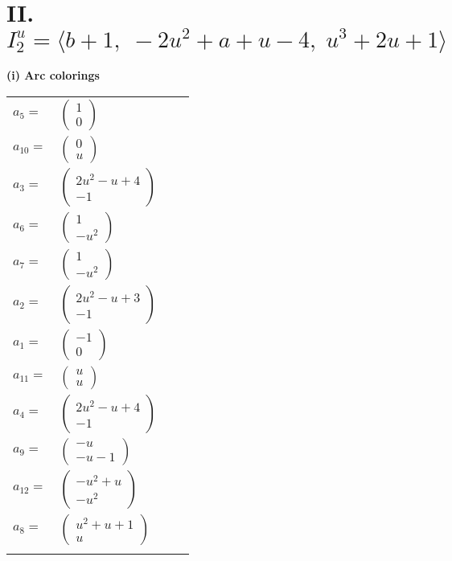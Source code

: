 \documentclass[1p]{elsarticle_modified}
\theoremstyle{definition}
\begin{document}
\centering \section*{II. $I^u_{2}= \langle b+1,\;-2 u^2+a+u-4,\;u^3+2 u+1 \rangle$}
\flushleft \textbf{(i) Arc colorings}\\
\begin{tabular}{m{7pt} m{180pt} m{7pt} m{180pt} }
\flushright $a_{5}=$&$\begin{pmatrix}1\\0\end{pmatrix}$ \\
\flushright $a_{10}=$&$\begin{pmatrix}0\\u\end{pmatrix}$ \\
\flushright $a_{3}=$&$\begin{pmatrix}2 u^2- u+4\\-1\end{pmatrix}$ \\
\flushright $a_{6}=$&$\begin{pmatrix}1\\- u^2\end{pmatrix}$ \\
\flushright $a_{7}=$&$\begin{pmatrix}1\\- u^2\end{pmatrix}$ \\
\flushright $a_{2}=$&$\begin{pmatrix}2 u^2- u+3\\-1\end{pmatrix}$ \\
\flushright $a_{1}=$&$\begin{pmatrix}-1\\0\end{pmatrix}$ \\
\flushright $a_{11}=$&$\begin{pmatrix}u\\u\end{pmatrix}$ \\
\flushright $a_{4}=$&$\begin{pmatrix}2 u^2- u+4\\-1\end{pmatrix}$ \\
\flushright $a_{9}=$&$\begin{pmatrix}- u\\- u-1\end{pmatrix}$ \\
\flushright $a_{12}=$&$\begin{pmatrix}- u^2+u\\- u^2\end{pmatrix}$ \\
\flushright $a_{8}=$&$\begin{pmatrix}u^2+u+1\\u\end{pmatrix}$\\&\end{tabular}
\end{document}
